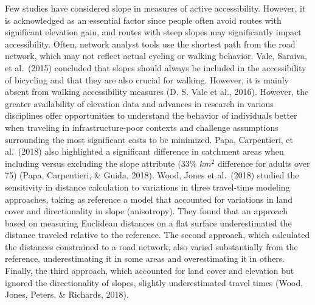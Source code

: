 \documentclass[12pt,twoside]{reedthesis}
\begin{document}
Few studies have considered slope in measures of active accessibility. However, it is acknowledged as an essential factor since people often avoid routes with significant elevation gain, and routes with steep slopes may significantly impact accessibility. Often, network analyst tools use the shortest path from the road network, which may not reflect actual cycling or walking behavior. Vale, Saraiva, et al.~(2015) concluded that slopes should always be included in the accessibility of bicycling and that they are also crucial for walking. However, it is mainly absent from walking accessibility measures (D. S. Vale et al., 2016). However, the greater availability of elevation data and advances in research in various disciplines offer opportunities to understand the behavior of individuals better when traveling in infrastructure-poor contexts and challenge assumptions surrounding the most significant costs to be minimized. Papa, Carpentieri, et al.~(2018) also highlighted a significant difference in catchment areas when including versus excluding the slope attribute (33\% \(km^2\) difference for adults over 75) (Papa, Carpentieri, \& Guida, 2018). Wood, Jones et al.~(2018) studied the sensitivity in distance calculation to variations in three travel-time modeling approaches, taking as reference a model that accounted for variations in land cover and directionality in slope (anisotropy). They found that an approach based on measuring Euclidean distances on a flat surface underestimated the distance traveled relative to the reference. The second approach, which calculated the distances constrained to a road network, also varied substantially from the reference, underestimating it in some areas and overestimating it in others. Finally, the third approach, which accounted for land cover and elevation but ignored the directionality of slopes, slightly underestimated travel times (Wood, Jones, Peters, \& Richards, 2018).
\end{document}
